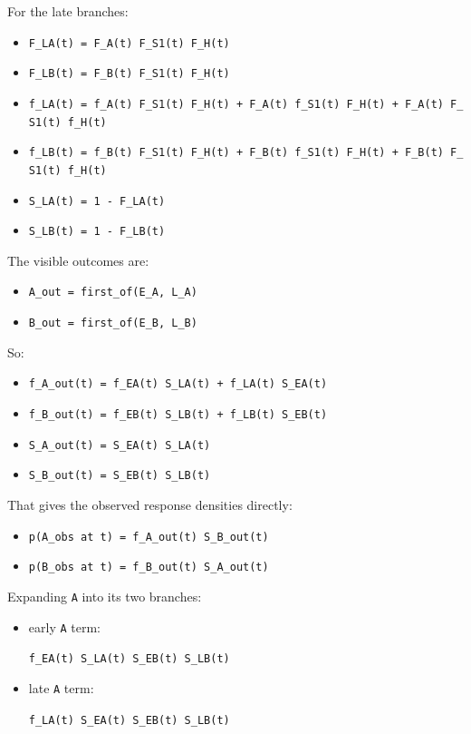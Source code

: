 \documentclass[
]{article}
\providecommand{\tightlist}{%
  \setlength{\itemsep}{0pt}\setlength{\parskip}{0pt}}
\begin{document}
For the late branches:

\begin{itemize}
\item
  \texttt{F\_LA(t)\ =\ F\_A(t)\ F\_S1(t)\ F\_H(t)}
\item
  \texttt{F\_LB(t)\ =\ F\_B(t)\ F\_S1(t)\ F\_H(t)}
\item
  \texttt{f\_LA(t)\ =\ f\_A(t)\ F\_S1(t)\ F\_H(t)\ +\ F\_A(t)\ f\_S1(t)\ F\_H(t)\ +\ F\_A(t)\ F\_S1(t)\ f\_H(t)}
\item
  \texttt{f\_LB(t)\ =\ f\_B(t)\ F\_S1(t)\ F\_H(t)\ +\ F\_B(t)\ f\_S1(t)\ F\_H(t)\ +\ F\_B(t)\ F\_S1(t)\ f\_H(t)}
\item
  \texttt{S\_LA(t)\ =\ 1\ -\ F\_LA(t)}
\item
  \texttt{S\_LB(t)\ =\ 1\ -\ F\_LB(t)}
\end{itemize}

The visible outcomes are:

\begin{itemize}
\tightlist
\item
  \texttt{A\_out\ =\ first\_of(E\_A,\ L\_A)}
\item
  \texttt{B\_out\ =\ first\_of(E\_B,\ L\_B)}
\end{itemize}

So:

\begin{itemize}
\item
  \texttt{f\_A\_out(t)\ =\ f\_EA(t)\ S\_LA(t)\ +\ f\_LA(t)\ S\_EA(t)}
\item
  \texttt{f\_B\_out(t)\ =\ f\_EB(t)\ S\_LB(t)\ +\ f\_LB(t)\ S\_EB(t)}
\item
  \texttt{S\_A\_out(t)\ =\ S\_EA(t)\ S\_LA(t)}
\item
  \texttt{S\_B\_out(t)\ =\ S\_EB(t)\ S\_LB(t)}
\end{itemize}

That gives the observed response densities directly:

\begin{itemize}
\tightlist
\item
  \texttt{p(A\_obs\ at\ t)\ =\ f\_A\_out(t)\ S\_B\_out(t)}
\item
  \texttt{p(B\_obs\ at\ t)\ =\ f\_B\_out(t)\ S\_A\_out(t)}
\end{itemize}

Expanding \texttt{A} into its two branches:

\begin{itemize}
\item
  early \texttt{A} term:

  \texttt{f\_EA(t)\ S\_LA(t)\ S\_EB(t)\ S\_LB(t)}
\item
  late \texttt{A} term:

  \texttt{f\_LA(t)\ S\_EA(t)\ S\_EB(t)\ S\_LB(t)}
\end{itemize}
\end{document}

